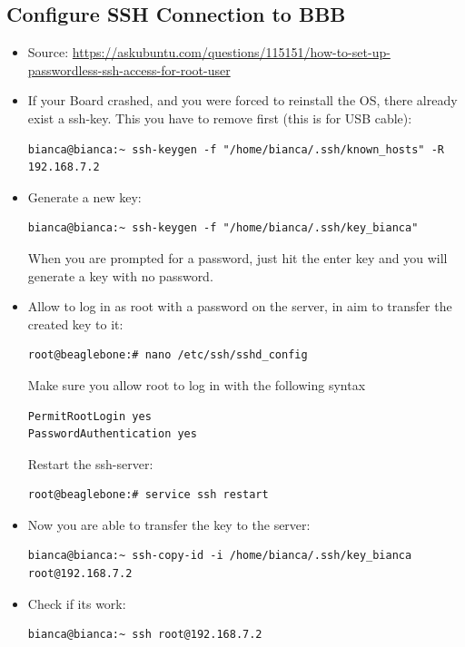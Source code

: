 \documentclass[
	fontsize=10pt
	paper=a4
]{scrartcl}
\begin{document}
\subsection{Configure SSH Connection to BBB}
\begin{itemize}
\item Source: \url{https://askubuntu.com/questions/115151/how-to-set-up-passwordless-ssh-access-for-root-user}

\item If your Board crashed, and you were forced to reinstall the OS, there already exist a ssh-key.
This you have to remove first (this is for USB cable):
\begin{lstlisting}
bianca@bianca:~ ssh-keygen -f "/home/bianca/.ssh/known_hosts" -R 192.168.7.2
\end{lstlisting}

\item Generate a new key:
\begin{lstlisting}
bianca@bianca:~ ssh-keygen -f "/home/bianca/.ssh/key_bianca"
\end{lstlisting}
When you are prompted for a password, just hit the enter key and you will generate a key with no password.

\item Allow to log in as root with a password on the server, in aim to transfer the created key to it:
\begin{lstlisting}
root@beaglebone:# nano /etc/ssh/sshd_config
\end{lstlisting}
Make sure you allow root to log in with the following syntax
\begin{lstlisting}
PermitRootLogin yes
PasswordAuthentication yes
\end{lstlisting}
Restart the ssh-server: 
\begin{lstlisting}
root@beaglebone:# service ssh restart
\end{lstlisting}

\item Now you are able to transfer the key to the server:
\begin{lstlisting}
bianca@bianca:~ ssh-copy-id -i /home/bianca/.ssh/key_bianca root@192.168.7.2
\end{lstlisting}

\item Check if its work:
\begin{lstlisting}
bianca@bianca:~ ssh root@192.168.7.2
\end{lstlisting}


\end{itemize}
\end{document}
